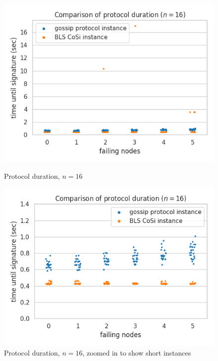 \begin{figure}[H]
    \centering
    \begin{minipage}{0.5\textwidth}
        \centering
        \includegraphics[width=\textwidth]{figures/1/round_wall_sum_16.png}
        \captionsetup{labelformat=empty}
        \caption{Protocol duration, $n = 16$}
    \end{minipage}\hfill
    \begin{minipage}{0.5\textwidth}
        \centering
        \includegraphics[width=\textwidth]{figures/1/round_wall_sum_zoomed_16.png}
        \captionsetup{labelformat=empty}
        \caption{Protocol duration, $n = 16$, zoomed in to show short instances}
    \end{minipage}\hfill
\end{figure}

